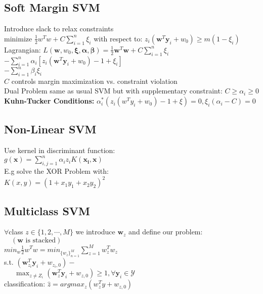\subsection*{Soft Margin SVM}
Introduce slack to relax constraints\\
minimize $\frac{1}{2}w^Tw + C\sum_{i=1}^n \xi_i$ with respect to: 
$z_i(\mathbf{w}^T\mathbf{y}_i+w_0)\geq m(1-\xi_i)$\\
Lagrangian: $L(\mathbf{w}, w_0,\mathbf{\xi}, \mathbf{\alpha}, \mathbf{\beta}) {=}\frac{1}{2}\mathbf{w}^T\mathbf{w}+C\sum_{i=1}^n\xi_i$
${-}\sum_{i=1}^n\alpha_i[z_i(\mathbf{w}^T\mathbf{y}_i{+}w_0){-}1{+}\xi_i]$\\
${-}\sum_{i=1}^n\beta_i\xi_i$\\
$C$ controls margin maximization vs. constraint violation\\
Dual Problem same as usual SVM but with supplementary constraint:
$C \geq \alpha_i \geq 0$
\textbf{Kuhn-Tucker Conditions:} 
$\alpha_i^*(z_i(w^Ty_i+w_0)-1 + \xi)= 0, \xi_i(\alpha_i-C) = 0$
\subsection*{Non-Linear SVM}
Use kernel in discriminant function: \\ $g(\mathbf{x})=\sum_{i,j=1}^n\alpha_iz_iK(\mathbf{x_i},\mathbf{x})$\\
E.g solve the XOR Problem with: \\
$K(x,y)=(1+x_1y_1+x_2y_2)^2$

\subsection*{Multiclass SVM}
$\forall$class $z\in\{1,2,\cdots,M\}$ we introduce $\mathbf{w}_z$ and define our problem: $\quad(\mathbf{w} \text{ is stacked})$\\
$min_w \frac{1}{2}w^Tw = min_{\{w_z\}_{n=1}^M} \sum_{z=1}^M w_z^Tw_z$ \\
s.t. $(\mathbf{w}_{z_i}^T\mathbf{y}_i+w_{z_i,0})-$\\
$\quad \ \ \max_{z\not=Z_i}(\mathbf{w}_z^T\mathbf{y}_i+w_{z,0})\geq 1, \forall {\mathbf{y}_i\in \mathcal{Y}}$ \\
classification: $\hat z = argmax_z (w_z^Ty + w_{z,0})$

